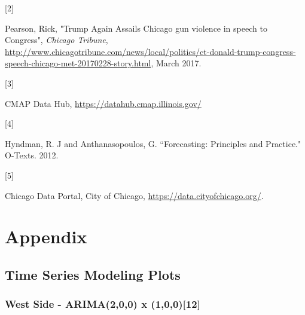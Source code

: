 \documentclass{article} %
\begin{document}
\hypertarget{Ref2}{[2]} Pearson, Rick, "Trump Again Assails Chicago gun violence in speech to Congress", \textit{Chicago Tribune}, \url{http://www.chicagotribune.com/news/local/politics/ct-donald-trump-congress-speech-chicago-met-20170228-story.html}, March 2017.

\hypertarget{Ref3}{[3]} CMAP Data Hub, \url{https://datahub.cmap.illinois.gov/}

\hypertarget{Ref4}{[4]} Hyndman, R. J and Anthanasopoulos, G. ``Forecasting: Principles and Practice."  O-Texts. 2012.

\hypertarget{Ref5}{[5]} Chicago Data Portal, City of Chicago, \url{https://data.cityofchicago.org/}.


\clearpage
\newpage

\section{Appendix}
\label{appendix}


\subsection{Time Series Modeling Plots}
\label{appendix_regression}

 
\subsubsection{West Side - ARIMA(2,0,0) x (1,0,0)[12]}
 

 
 
\end{document}
